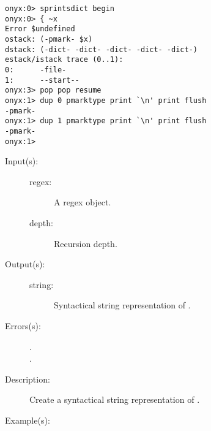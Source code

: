 \begin{description}
\begin{description}
\begin{verbatim}
onyx:0> sprintsdict begin
onyx:0> { ~x
Error $undefined
ostack: (-pmark- $x)
dstack: (-dict- -dict- -dict- -dict- -dict-)
estack/istack trace (0..1):
0:      -file-
1:      --start--
onyx:3> pop pop resume
onyx:1> dup 0 pmarktype print `\n' print flush
-pmark-
onyx:1> dup 1 pmarktype print `\n' print flush
-pmark-
onyx:1>
		\end{verbatim}
	\end{description}
\label{sprintsdict:regextype}
\item[{\onyxop{regex depth}{regextype}{string}}: ]
	\begin{description}\item[]
	\item[Input(s): ]
		\begin{description}\item[]
		\item[regex: ]
			A regex object.
		\item[depth: ]
			Recursion depth.
		\end{description}
	\item[Output(s): ]
		\begin{description}\item[]
		\item[string: ]
			Syntactical string representation of .
		\end{description}
	\item[Errors(s): ]
		\begin{description}\item[]
		\item[.]
		\item[.]
		\end{description}
	\item[Description: ]
		Create a syntactical string representation of .
	\item[Example(s): ]\begin{verbatim}


\end{verbatim}
\end{description}
\end{description}

